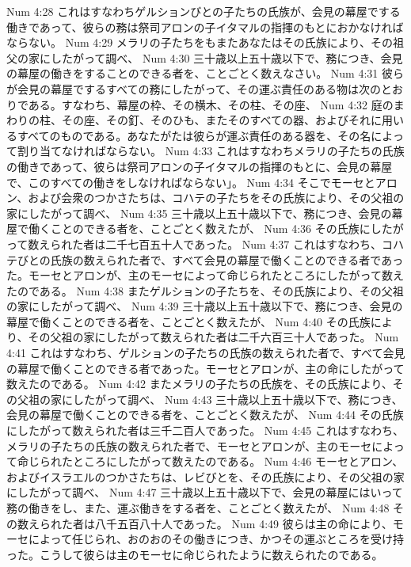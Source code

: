 Num 4:28  これはすなわちゲルションびとの子たちの氏族が、会見の幕屋でする働きであって、彼らの務は祭司アロンの子イタマルの指揮のもとにおかなければならない。
Num 4:29  メラリの子たちをもまたあなたはその氏族により、その祖父の家にしたがって調べ、
Num 4:30  三十歳以上五十歳以下で、務につき、会見の幕屋の働きをすることのできる者を、ことごとく数えなさい。
Num 4:31  彼らが会見の幕屋でするすべての務にしたがって、その運ぶ責任のある物は次のとおりである。すなわち、幕屋の枠、その横木、その柱、その座、
Num 4:32  庭のまわりの柱、その座、その釘、そのひも、またそのすべての器、およびそれに用いるすべてのものである。あなたがたは彼らが運ぶ責任のある器を、その名によって割り当てなければならない。
Num 4:33  これはすなわちメラリの子たちの氏族の働きであって、彼らは祭司アロンの子イタマルの指揮のもとに、会見の幕屋で、このすべての働きをしなければならない」。
Num 4:34  そこでモーセとアロン、および会衆のつかさたちは、コハテの子たちをその氏族により、その父祖の家にしたがって調べ、
Num 4:35  三十歳以上五十歳以下で、務につき、会見の幕屋で働くことのできる者を、ことごとく数えたが、
Num 4:36  その氏族にしたがって数えられた者は二千七百五十人であった。
Num 4:37  これはすなわち、コハテびとの氏族の数えられた者で、すべて会見の幕屋で働くことのできる者であった。モーセとアロンが、主のモーセによって命じられたところにしたがって数えたのである。
Num 4:38  またゲルションの子たちを、その氏族により、その父祖の家にしたがって調べ、
Num 4:39  三十歳以上五十歳以下で、務につき、会見の幕屋で働くことのできる者を、ことごとく数えたが、
Num 4:40  その氏族により、その父祖の家にしたがって数えられた者は二千六百三十人であった。
Num 4:41  これはすなわち、ゲルションの子たちの氏族の数えられた者で、すべて会見の幕屋で働くことのできる者であった。モーセとアロンが、主の命にしたがって数えたのである。
Num 4:42  またメラリの子たちの氏族を、その氏族により、その父祖の家にしたがって調べ、
Num 4:43  三十歳以上五十歳以下で、務につき、会見の幕屋で働くことのできる者を、ことごとく数えたが、
Num 4:44  その氏族にしたがって数えられた者は三千二百人であった。
Num 4:45  これはすなわち、メラリの子たちの氏族の数えられた者で、モーセとアロンが、主のモーセによって命じられたところにしたがって数えたのである。
Num 4:46  モーセとアロン、およびイスラエルのつかさたちは、レビびとを、その氏族により、その父祖の家にしたがって調べ、
Num 4:47  三十歳以上五十歳以下で、会見の幕屋にはいって務の働きをし、また、運ぶ働きをする者を、ことごとく数えたが、
Num 4:48  その数えられた者は八千五百八十人であった。
Num 4:49  彼らは主の命により、モーセによって任じられ、おのおのその働きにつき、かつその運ぶところを受け持った。こうして彼らは主のモーセに命じられたように数えられたのである。
